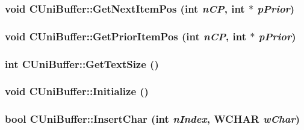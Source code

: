 \label{class_c_uni_buffer_a8c781a0b6673cb2e1c0fd67e9bdcebb5}
\hypertarget{class_c_uni_buffer_a925e667b4bdfa744f41d1fc4852d2ab1}{
\subsubsection[{GetNextItemPos}]{\setlength{\rightskip}{0pt plus 5cm}void CUniBuffer::GetNextItemPos (int {\em nCP}, \/  int $\ast$ {\em pPrior})}}
\label{class_c_uni_buffer_a925e667b4bdfa744f41d1fc4852d2ab1}
\hypertarget{class_c_uni_buffer_aef3e042ec363325c37371880c0490aa4}{
\subsubsection[{GetPriorItemPos}]{\setlength{\rightskip}{0pt plus 5cm}void CUniBuffer::GetPriorItemPos (int {\em nCP}, \/  int $\ast$ {\em pPrior})}}
\label{class_c_uni_buffer_aef3e042ec363325c37371880c0490aa4}
\hypertarget{class_c_uni_buffer_a2e50dad415c9fa8ef56926b76500f7a3}{
\subsubsection[{GetTextSize}]{\setlength{\rightskip}{0pt plus 5cm}int CUniBuffer::GetTextSize ()}}
\label{class_c_uni_buffer_a2e50dad415c9fa8ef56926b76500f7a3}
\hypertarget{class_c_uni_buffer_a05f3f1bcd1444d9e5ae974f9d83fe5f8}{
\subsubsection[{Initialize}]{\setlength{\rightskip}{0pt plus 5cm}void CUniBuffer::Initialize ()}}
\label{class_c_uni_buffer_a05f3f1bcd1444d9e5ae974f9d83fe5f8}
\hypertarget{class_c_uni_buffer_a23dfb66bd7d577ca78d55f387945b635}{
\subsubsection[{InsertChar}]{\setlength{\rightskip}{0pt plus 5cm}bool CUniBuffer::InsertChar (int {\em nIndex}, \/  WCHAR {\em wChar})}}
